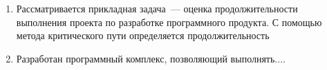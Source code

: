 \begin{enumerate}
  \item Рассматривается прикладная задача~--- оценка продолжительности выполнения проекта по разработке программного продукта. С помощью метода критического пути определяется продолжительность 
  \item Разработан программный комплекс, позволяющий выполнять....
\end{enumerate}